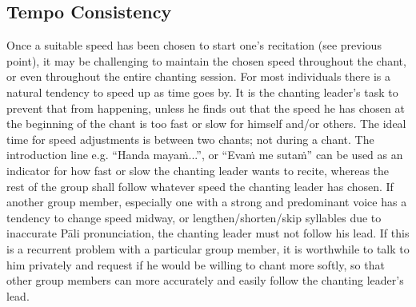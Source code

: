 \subsection*{Tempo Consistency}
\begin{justify}
  Once a suitable speed has been chosen to start one's recitation (see previous point), it may be challenging to maintain the chosen speed throughout the chant, or even throughout the entire chanting session. For most individuals there is a natural tendency to speed up as time goes by. It is the chanting leader's task to prevent that from happening, unless he finds out that the speed he has chosen at the beginning of the chant is too fast or slow for himself and/or others. The ideal time for speed adjustments is between two chants; not during a chant. The introduction line e.g. ``Handa mayaṁ...'', or ``Evaṁ me sutaṁ'' can be used as an indicator for how fast or slow the chanting leader wants to recite, whereas the rest of the group shall follow whatever speed the chanting leader has chosen. If another group member, especially one with a strong and predominant voice has a tendency to change speed midway, or lengthen/shorten/skip syllables due to inaccurate Pāli pronunciation, the chanting leader must not follow his lead. If this is a recurrent problem with a particular group member, it is worthwhile to talk to him privately and request if he would be willing to chant more softly, so that other group members can more accurately and easily follow the chanting leader's lead.
\end{justify}

